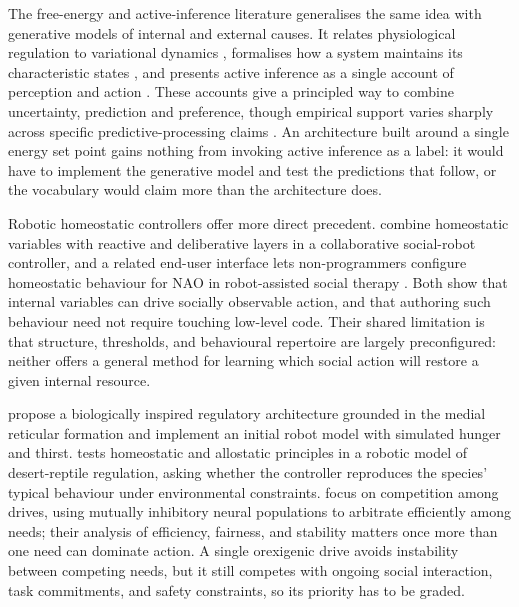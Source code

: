 The free-energy and active-inference literature generalises the same idea with generative models of internal and external causes. It relates physiological regulation to variational dynamics \citep{BettingerFriston2023PhysiologicalRegulation}, formalises how a system maintains its characteristic states \citep{Friston2023FreeEnergy}, and presents active inference as a single account of perception and action \citep{Pezzulo2024ActiveInference}. These accounts give a principled way to combine uncertainty, prediction and preference, though empirical support varies sharply across specific predictive-processing claims \citep{Hodson2024PredictiveCoding}. An architecture built around a single energy set point gains nothing from invoking active inference as a label: it would have to implement the generative model and test the predictions that follow, or the vocabulary would claim more than the architecture does.

Robotic homeostatic controllers offer more direct precedent. \citet{Cao2017CollaborativeHomeostatic} combine homeostatic variables with reactive and deliberative layers in a collaborative social-robot controller, and a related end-user interface lets non-programmers configure homeostatic behaviour for NAO in robot-assisted social therapy \citep{Cao2017EndUserHomeostatic}. Both show that internal variables can drive socially observable action, and that authoring such behaviour need not require touching low-level code. Their shared limitation is that structure, thresholds, and behavioural repertoire are largely preconfigured: neither offers a general method for learning which social action will restore a given internal resource.

\citet{GuerreroRosado2021RegulatoryBehaviour} propose a biologically inspired regulatory architecture grounded in the medial reticular formation and implement an initial robot model with simulated hunger and thirst. \citet{Ngo2021DesertReptiles} tests homeostatic and allostatic principles in a robotic model of desert-reptile regulation, asking whether the controller reproduces the species' typical behaviour under environmental constraints. \citet{Rosado2022DriveCompetition} focus on competition among drives, using mutually inhibitory neural populations to arbitrate efficiently among needs; their analysis of efficiency, fairness, and stability matters once more than one need can dominate action. A single orexigenic drive avoids instability between competing needs, but it still competes with ongoing social interaction, task commitments, and safety constraints, so its priority has to be graded.

